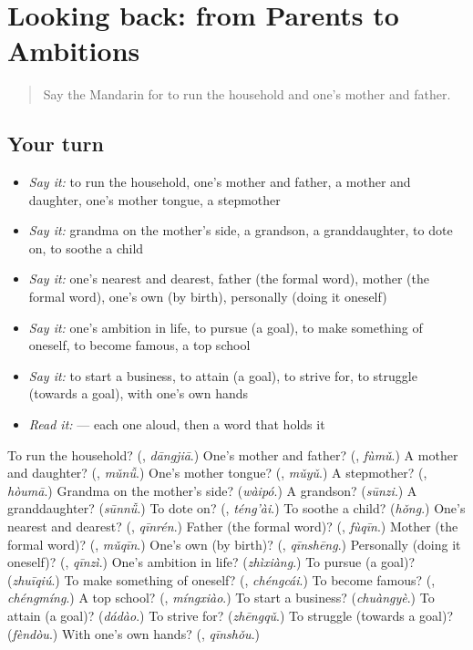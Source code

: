 \section[(dialogue)]{Looking back: from Parents to Ambitions}

\label{lesson:ZH-R513-review-509-513}



\begin{quote}
Say the Mandarin for to run the household and one's mother and father.
\end{quote}

\subsection*{Your turn}
\begin{itemize}
\raggedright
  \item \emph{Say it:} to run the household, one's mother and father, a mother and daughter, one's mother tongue, a stepmother
  \item \emph{Say it:} grandma on the mother's side, a grandson, a granddaughter, to dote on, to soothe a child
  \item \emph{Say it:} one's nearest and dearest, father (the formal word), mother (the formal word), one's own (by birth), personally (doing it oneself)
  \item \emph{Say it:} one's ambition in life, to pursue (a goal), to make something of oneself, to become famous, a top school
  \item \emph{Say it:} to start a business, to attain (a goal), to strive for, to struggle (towards a goal), with one's own hands
  \item \emph{Read it:}   — each one aloud, then a word that holds it
\end{itemize}

\begin{tcolorbox}[breakable,colback=teal!4,colframe=teal!35!black,title={Before you move on}]
To run the household? (\textbf{}, \emph{dāngjiā}.) One's mother and father? (\textbf{}, \emph{fùmǔ}.) A mother and daughter? (\textbf{}, \emph{mǔnǚ}.) One's mother tongue? (\textbf{}, \emph{mǔyǔ}.) A stepmother? (\textbf{}, \emph{hòumā}.) Grandma on the mother's side? (\emph{wàipó}.) A grandson? (\emph{sūnzi}.) A granddaughter? (\emph{sūnnǚ}.) To dote on? (\textbf{}, \emph{téng'ài}.) To soothe a child? (\emph{hǒng}.) One's nearest and dearest? (\textbf{}, \emph{qīnrén}.) Father (the formal word)? (\textbf{}, \emph{fùqīn}.) Mother (the formal word)? (\textbf{}, \emph{mǔqīn}.) One's own (by birth)? (\textbf{}, \emph{qīnshēng}.) Personally (doing it oneself)? (\textbf{}, \emph{qīnzì}.) One's ambition in life? (\emph{zhìxiàng}.) To pursue (a goal)? (\emph{zhuīqiú}.) To make something of oneself? (\textbf{}, \emph{chéngcái}.) To become famous? (\textbf{}, \emph{chéngmíng}.) A top school? (\textbf{}, \emph{míngxiào}.) To start a business? (\emph{chuàngyè}.) To attain (a goal)? (\emph{dádào}.) To strive for? (\emph{zhēngqǔ}.) To struggle (towards a goal)? (\emph{fèndòu}.) With one's own hands? (\textbf{}, \emph{qīnshǒu}.)
\end{tcolorbox}
